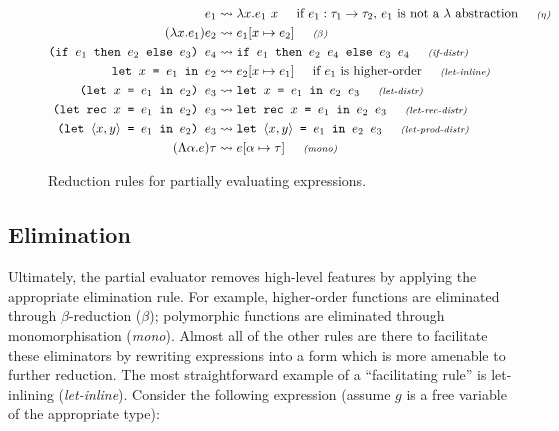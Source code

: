 \documentclass[runningheads]{llncs}
\begin{document}
\begin{figure*}[h]

  \begin{minipage}[c]{\textwidth}
    \begin{align*}
      e_1 &\leadsto \lambda x. e_1\ x \hskip 0.5cm \text{if $e_1 : \tau_1 \rightarrow \tau_2$, $e_1$ is not a $\lambda$ abstraction} \textit{\hskip 0.5cm\scriptsize ($\eta$)}\\
      (\lambda x. e_1) e_2 &\leadsto e_1[x \mapsto e_2]  \textit{\hskip 0.5cm\scriptsize ($\beta$)}\\
      \texttt{(if $e_1$ then $e_2$ else $e_3$) $e_4$} &\leadsto \texttt{if $e_1$ then $e_2$ $e_4$ else $e_3$ $e_4$}\textit{\hskip 0.5cm\scriptsize (if-distr)} \\
      \texttt{let $x$ = $e_1$ in $e_2$} &\leadsto e_2[x \mapsto e_1] \hskip 0.5cm \text{if $e_1$ is higher-order} \textit{\hskip 0.5cm\scriptsize (let-inline)} \\
      \texttt{(let $x$ = $e_1$ in $e_2$) $e_3$} &\leadsto \texttt{let $x$ = $e_1$ in $e_2$ $e_3$}\textit{\hskip 0.5cm\scriptsize (let-distr)} \\
      \texttt{(let rec $x$ = $e_1$ in $e_2$) $e_3$} &\leadsto \texttt{let rec $x$ = $e_1$ in $e_2$ $e_3$}\textit{\hskip 0.5cm\scriptsize (let-rec-distr)} \\
      \texttt{(let $\langle x , y \rangle$ = $e_1$ in $e_2$) $e_3$} &\leadsto \texttt{let $\langle x , y \rangle$ = $e_1$ in $e_2$ $e_3$}\textit{\hskip 0.5cm\scriptsize (let-prod-distr)} \\
      (\Lambda \alpha. e) \tau &\leadsto e[\alpha \mapsto \tau] \textit{\hskip 0.5cm\scriptsize (mono)}
    \end{align*}
  \end{minipage}

  \caption{Reduction rules for partially evaluating expressions.}
  \label{fig:pe-expr-rules}
\end{figure*}

\subsection{Elimination}

Ultimately, the partial evaluator removes high-level features by applying the appropriate elimination rule. For example, higher-order functions are eliminated through $\beta$-reduction (\textit{$\beta$}); polymorphic functions are eliminated through monomorphisation (\textit{mono}). Almost all of the other rules are there to facilitate these eliminators by rewriting expressions into a form which is more amenable to further reduction. The most straightforward example of a ``facilitating rule'' is let-inlining (\textit{let-inline}). Consider the following expression (assume $g$ is a free variable of the appropriate type):
\end{document}
